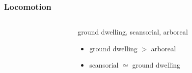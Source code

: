 \documentclass{beamer}
\begin{document}
\begin{frame}
  \frametitle{Locomotion}
  \begin{columns}
    \begin{column}{0.5\textwidth}
    \end{column}
    \begin{column}{0.5\textwidth}
      ground dwelling, scansorial, arboreal

      \vspace{0.3cm}

      \begin{itemize}
        \item ground dwelling \(>\) arboreal
          \vspace{0.2cm}
        \item scansorial \(\simeq\) ground dwelling 
      \end{itemize}
    \end{column}
  \end{columns}
\end{frame}
\end{document}
